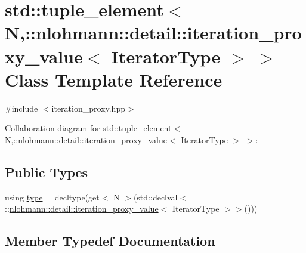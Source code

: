 \hypertarget{classstd_1_1tuple__element_3_01_n_00_1_1nlohmann_1_1detail_1_1iteration__proxy__value_3_01_iterator_type_01_4_01_4}{}\section{std\+:\+:tuple\+\_\+element$<$ N,\+:\+:nlohmann\+:\+:detail\+:\+:iteration\+\_\+proxy\+\_\+value$<$ Iterator\+Type $>$ $>$ Class Template Reference}
\label{classstd_1_1tuple__element_3_01_n_00_1_1nlohmann_1_1detail_1_1iteration__proxy__value_3_01_iterator_type_01_4_01_4}


{\ttfamily \#include $<$iteration\+\_\+proxy.\+hpp$>$}



Collaboration diagram for std\+:\+:tuple\+\_\+element$<$ N,\+:\+:nlohmann\+:\+:detail\+:\+:iteration\+\_\+proxy\+\_\+value$<$ Iterator\+Type $>$ $>$\+:
\subsection*{Public Types}
\begin{DoxyCompactItemize}
\item 
using \hyperlink{classstd_1_1tuple__element_3_01_n_00_1_1nlohmann_1_1detail_1_1iteration__proxy__value_3_01_iterator_type_01_4_01_4_a9469c97fd711b823af47c1ff75a09ada}{type} = decltype(get$<$ N $>$(std\+::declval$<$ \+::\hyperlink{classnlohmann_1_1detail_1_1iteration__proxy__value}{nlohmann\+::detail\+::iteration\+\_\+proxy\+\_\+value}$<$ Iterator\+Type $>$$>$()))
\end{DoxyCompactItemize}


\subsection{Member Typedef Documentation}
